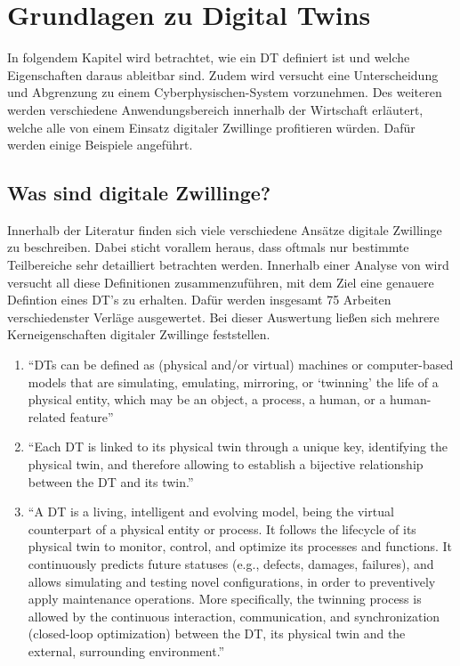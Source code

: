 \chapter{Grundlagen zu Digital Twins}

In folgendem Kapitel wird betrachtet, wie ein \ac{DT} definiert ist und welche Eigenschaften daraus ableitbar sind. Zudem wird versucht eine Unterscheidung und Abgrenzung zu einem Cyberphysischen-System vorzunehmen. Des weiteren werden verschiedene Anwendungsbereich innerhalb der Wirtschaft erläutert, welche alle von einem Einsatz digitaler Zwillinge profitieren würden. Dafür werden einige Beispiele angeführt.

\section{Was sind digitale Zwillinge?}

Innerhalb der Literatur finden sich viele verschiedene Ansätze digitale Zwillinge zu beschreiben. Dabei sticht vorallem heraus, dass oftmals nur bestimmte Teilbereiche sehr detailliert betrachten werden. Innerhalb einer Analyse von \citeauthor{barricelli2019survey} wird versucht all diese Definitionen zusammenzuführen, mit dem Ziel eine genauere Defintion eines \ac{DT}'s zu erhalten. Dafür werden insgesamt 75 Arbeiten verschiedenster Verläge ausgewertet.\autocite[S. 4, Kapitel 4]{barricelli2019survey} Bei dieser Auswertung ließen sich mehrere Kerneigenschaften digitaler Zwillinge feststellen.\autocite[\ppno~108953]{fuller2020digital}

\begin{enumerate}
    \item \enquote{\ac{DT}s can be deﬁned as (physical and/or virtual) machines or computer-based models that are simulating, emulating, mirroring, or \enquote{twinning} the life of a physical entity, which may be an object, a process, a human, or a human-related feature}
    \item \enquote{Each DT is linked to its physical twin through a unique key, identifying the physical twin, and therefore allowing to establish a bijective relationship between the DT and its twin.}
    \item \enquote{A DT is a living, intelligent and evolving model, being the virtual counterpart of a physical entity or process. It follows the lifecycle of its physical twin to monitor, control, and optimize its processes and functions. It continuously predicts future statuses (e.g., defects, damages, failures), and allows simulating and testing novel conﬁgurations, in order to preventively apply maintenance operations. More speciﬁcally, the twinning process is allowed by the continuous interaction, communication, and synchronization (closed-loop optimization) between the DT, its physical twin and the external, surrounding environment.}
\end{enumerate}\label{def:dt}

